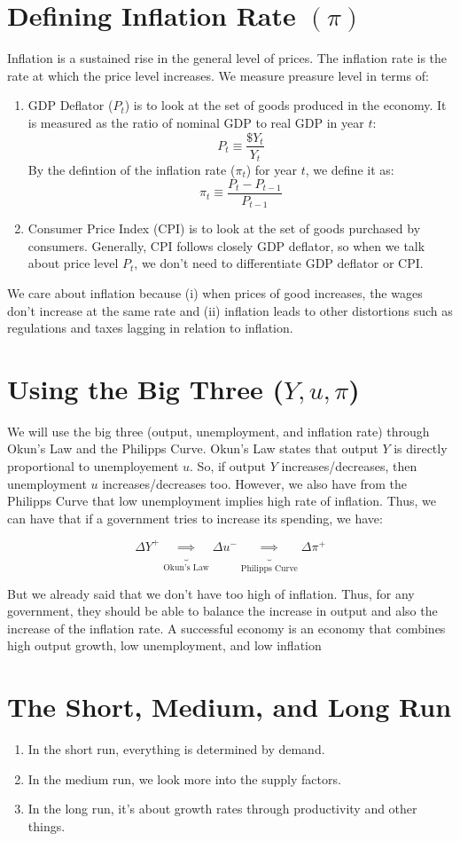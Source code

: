\documentclass{extarticle}
\begin{document}
\section{Defining Inflation Rate $(\pi)$}
Inflation is a sustained rise in the general level of prices. The inflation rate is the rate at which the price level increases. We measure preasure level in terms of:
\begin{enumerate}
	\item GDP Deflator ($P_t$) is to look at the set of goods produced in the economy. It is measured as the ratio of nominal GDP to real GDP in year $t$:
	$$P_t \equiv \frac{\$Y_t}{Y_t} $$
	By the defintion of the inflation rate ($\pi_t$) for year $t$, we define it as:
	$$\pi_t \equiv \frac{P_t - P_{t-1}}{P_{t-1}}$$
	\item Consumer Price Index (CPI) is to look at the set of goods purchased by consumers. Generally, CPI follows closely GDP deflator, so when we talk about price level $P_t$, we don't need to differentiate GDP deflator or CPI. 
\end{enumerate}
We care about inflation because (i) when prices of good increases, the wages don't increase at the same rate and (ii) inflation leads to other distortions such as regulations and taxes lagging in relation to inflation.

\section{Using the Big Three ($Y, u, \pi$)}
We will use the big three (output, unemployment, and inflation rate) through Okun's Law and the Philipps Curve. Okun's Law states that output $Y$ is directly proportional to unemployement $u$. So, if output $Y$ increases/decreases, then unemployment $u$ increases/decreases too. However, we also have from the Philipps Curve that low unemployment implies high rate of inflation. Thus, we can have that if a government tries to increase its spending, we have:

$$\Delta Y^+ \underbrace{\implies}_{\text{Okun's Law}} \Delta u^- \underbrace{\implies}_{\text{Philipps Curve}} \Delta \pi^+$$ 

But we already said that we don't have too high of inflation. Thus, for any government, they should be able to balance the increase in output and also the increase of the inflation rate. A successful economy is an economy that combines high output growth, low
unemployment, and low inflation

\section{The Short, Medium, and Long Run}
\begin{enumerate}
	\item In the short run, everything is determined by demand.
	\item In the medium run, we look more into the supply factors.
	\item In the long run, it's about growth rates through productivity and other things.
\end{enumerate}
\end{document}
